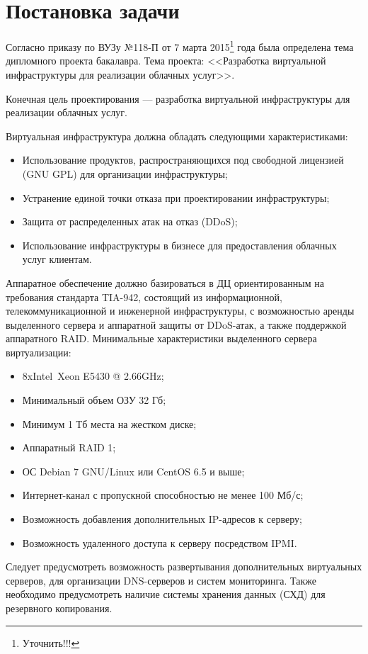 \section{Постановка задачи}
Согласно приказу по ВУЗу №118-П от 7 марта 2015\footnote{Уточнить!!!} года была определена тема дипломного проекта бакалавра.
Тема проекта: <<Разработка виртуальной инфраструктуры для реализации облачных услуг>>.

Конечная цель проектирования --- разработка виртуальной инфраструктуры для реализации облачных услуг.

Виртуальная инфраструктура должна обладать следующими характеристиками:
\begin{itemize}
    \item Использование продуктов, распространяющихся под свободной лицензией (GNU GPL) для организации инфраструктуры;
    \item Устранение единой точки отказа при проектировании инфраструктуры;
    \item Защита от распределенных атак на отказ (DDoS);
    \item Использование инфраструктуры в бизнесе для предоставления облачных услуг клиентам.
\end{itemize}

Аппаратное обеспечение должно базироваться в ДЦ ориентированным на требования стандарта TIA-942, состоящий из информационной, телекоммуникационной и инженерной инфраструктуры, с возможностью аренды выделенного сервера и аппаратной защиты от DDoS-атак, а также поддержкой аппаратного RAID.
Минимальные характеристики выделенного сервера виртуализации:
\begin{itemize}
    \item 8xIntel\textregistered~Xeon E5430 @ 2.66GHz;
    \item Минимальный объем ОЗУ 32 Гб;
    \item Минимум 1 Тб места на жестком диске;
    \item Аппаратный RAID 1;
    \item ОС Debian 7 GNU/Linux или CentOS 6.5 и выше;
    \item Интернет-канал с пропускной способностью не менее 100 Мб/с;
    \item Возможность добавления дополнительных IP-адресов к серверу;
    \item Возможность удаленного доступа к серверу посредством IPMI.
\end{itemize}

Следует предусмотреть возможность развертывания дополнительных виртуальных серверов, для организации DNS-серверов и систем мониторинга.
Также необходимо предусмотреть наличие системы хранения данных (СХД) для резервного копирования.

